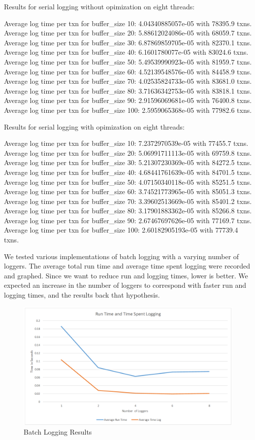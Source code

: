 Results for serial logging without opimization on eight threads:


Average log time per txn for buffer_size 10: 4.04340885057e-05 with 78395.9 txns.
Average log time per txn for buffer_size 20: 5.88612024086e-05 with 68059.7 txns.
Average log time per txn for buffer_size 30: 6.87869859705e-05 with 82370.1 txns.
Average log time per txn for buffer_size 40: 6.1601780077e-05 with 83024.6 txns.
Average log time per txn for buffer_size 50: 5.49539990923e-05 with 81959.7 txns.
Average log time per txn for buffer_size 60: 4.52139548576e-05 with 84458.9 txns.
Average log time per txn for buffer_size 70: 4.02535824733e-05 with 83681.0 txns.
Average log time per txn for buffer_size 80: 3.71636342753e-05 with 83818.1 txns.
Average log time per txn for buffer_size 90: 2.91596069681e-05 with 76400.8 txns.
Average log time per txn for buffer_size 100: 2.5959065368e-05 with 77982.6 txns.

Results for serial logging with opimization on eight threads:


Average log time per txn for buffer_size 10: 7.2372970539e-05 with 77455.7 txns.
Average log time per txn for buffer_size 20: 5.06991711113e-05 with 69759.8 txns.
Average log time per txn for buffer_size 30: 5.21307230369e-05 with 84272.5 txns.
Average log time per txn for buffer_size 40: 4.68441761639e-05 with 84701.5 txns.
Average log time per txn for buffer_size 50: 4.07150340118e-05 with 85251.5 txns.
Average log time per txn for buffer_size 60: 3.74521773965e-05 with 85051.3 txns.
Average log time per txn for buffer_size 70: 3.39602513669e-05 with 85401.2 txns.
Average log time per txn for buffer_size 80: 3.17901883362e-05 with 85266.8 txns.
Average log time per txn for buffer_size 90: 2.67467697626e-05 with 77169.7 txns.
Average log time per txn for buffer_size 100: 2.60182905193e-05 with 77739.4 txns.


We tested various implementations of batch logging with a varying number of loggers. The average total run time and average time spent logging were recorded and graphed. Since we want to reduce run and logging times, lower is better. We expected an increase in the number of loggers to correspond with faster run and logging times, and the results back that hypothesis.
\begin{figure}
	\caption{Batch Logging Results}
	\includegraphics[width=\textwidth]{BatchLoggingResults.png}
\end{figure}